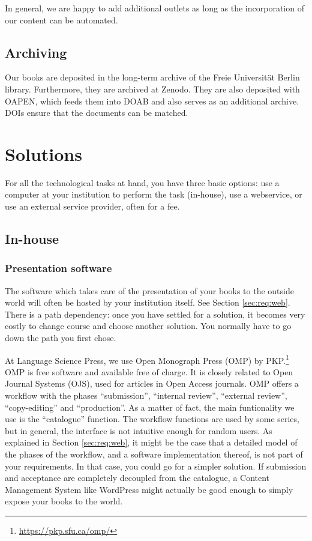 \documentclass[nonflat,smallfont
]{langsci/langscibook}
\newcommand{\footurl}[1]{\footnote{\url{#1}}}
\begin{document}
In general, we are happy to add additional outlets as long as the incorporation of our content can be automated.  
 
   


\subsection{Archiving}
Our books are deposited in the long-term archive of the Freie Universität Berlin library. Furthermore, they are archived at Zenodo. They are also deposited with OAPEN, which feeds them into DOAB and also serves as an additional archive. DOIs ensure that the documents can be matched.

\section{Solutions}\label{sec:solutions}
For all the technological tasks at hand, you have three basic options: use a computer at your institution to perform the task (in-house), use a webservice, or use an external service provider, often for a fee. 

\subsection{In-house}
\subsubsection{Presentation software}
The software which takes care of the presentation of your books to the outside world will often be hosted by your institution itself. See Section \ref{sec:req:web}. There is a path dependency: once you have settled for a solution, it becomes very costly to change course and choose another solution. You normally have to go down the path you first chose. 

At Language Science Press, we use Open Monograph Press (OMP) by PKP.\footurl{https://pkp.sfu.ca/omp/} OMP is free software and available free of charge. It is closely related to Open Journal Systems (OJS), used for articles in Open Access journals. OMP offers a workflow with the phases ``submission'', ``internal review'', ``external review'', ``copy-editing'' and ``production''. As a matter of fact, the main funtionality we use is the ``catalogue'' function. The workflow functions are used by some series, but in general, the interface is not intuitive enough for random users. As explained in Section \ref{sec:req:web}, it might be the case that a detailed model of the phases of the workflow, and a software implementation thereof, is not part of your requirements. In that case, you could go for a simpler solution. If submission and acceptance are completely decoupled from the catalogue, a Content Management System like WordPress might actually be good enough to simply expose your books to the world. 
\end{document}
